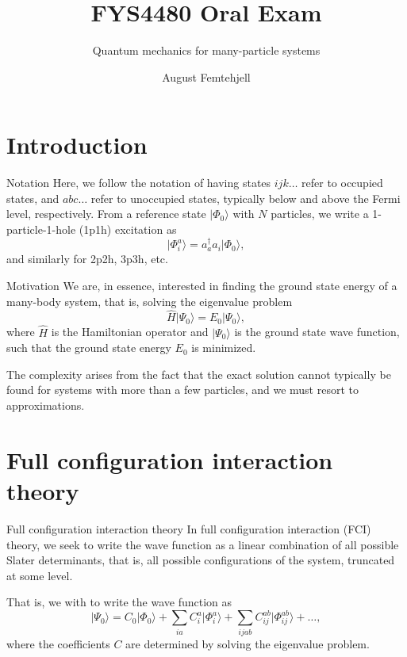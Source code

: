 \documentclass[UKenglish,aspectratio=169]{beamer}
\title{FYS4480 Oral Exam}
\subtitle{Quantum mechanics for many-particle systems}
\author{August Femtehjell}
\begin{document}
\uiofrontpage[
    date={16th December, 2024},
]

\section{Introduction}
\begin{frame}{Notation}
    Here, we follow the notation of having states $ijk\ldots$ refer to occupied states, and $abc\ldots$ refer to unoccupied states, typically below and above the Fermi level, respectively.
    From a reference state $\lvert \Phi_0 \rangle$ with $N$ particles, we write a 1-particle-1-hole (1p1h) excitation as
    \begin{equation}
        \lvert \Phi_{i}^{a} \rangle
        = a_{a}^\dagger a_{i} \lvert \Phi_0 \rangle,
    \end{equation}
    and similarly for 2p2h, 3p3h, etc.
\end{frame}

\begin{frame}{Motivation}
    We are, in essence, interested in finding the ground state energy of a many-body system, that is, solving the eigenvalue problem
    \begin{equation}
        \hat{H} \lvert \Psi_0 \rangle = E_0 \lvert \Psi_0 \rangle,
    \end{equation}
    where $\hat{H}$ is the Hamiltonian operator and $\lvert \Psi_0 \rangle$ is the ground state wave function, such that the ground state energy $E_0$ is minimized.

    \bigskip

    The complexity arises from the fact that the exact solution cannot typically be found for systems with more than a few particles, and we must resort to approximations.
\end{frame}

\section{Full configuration interaction theory}

\begin{frame}{Full configuration interaction theory}
    In full configuration interaction (FCI) theory, we seek to write the wave function as a linear combination of all possible Slater determinants, that is, all possible configurations of the system, truncated at some level.

    \bigskip

    That is, we with to write the wave function as
    \begin{equation}
        \lvert \Psi_0 \rangle = C_0 \lvert \Phi_0 \rangle + \sum_{ia} C_i^a \lvert \Phi_i^a \rangle + \sum_{ijab} C_{ij}^{ab} \lvert \Phi_{ij}^{ab} \rangle + \ldots,
    \end{equation}
    where the coefficients $C$ are determined by solving the eigenvalue problem.
\end{frame}
\end{document}
